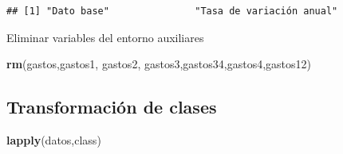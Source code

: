\documentclass[notspecified,article,submit,moreauthors,pdftex]{Definitions/mdpi}
\newenvironment{Shaded}{\begin{snugshade}}{\end{snugshade}}
\newcommand{\AttributeTok}[1]{\textcolor[rgb]{0.13,0.29,0.53}{#1}}
\newcommand{\CommentTok}[1]{\textcolor[rgb]{0.56,0.35,0.01}{\textit{#1}}}
\newcommand{\DecValTok}[1]{\textcolor[rgb]{0.00,0.00,0.81}{#1}}
\newcommand{\FunctionTok}[1]{\textcolor[rgb]{0.13,0.29,0.53}{\textbf{#1}}}
\newcommand{\NormalTok}[1]{#1}
\newcommand{\OtherTok}[1]{\textcolor[rgb]{0.56,0.35,0.01}{#1}}
\newcommand{\SpecialCharTok}[1]{\textcolor[rgb]{0.81,0.36,0.00}{\textbf{#1}}}
\newcommand{\StringTok}[1]{\textcolor[rgb]{0.31,0.60,0.02}{#1}}
\begin{document}
\begin{Shaded}
\end{Shaded}

\begin{verbatim}
## [1] "Dato base"               "Tasa de variación anual"
\end{verbatim}

\begin{Shaded}
\end{Shaded}

Eliminar variables del entorno auxiliares

\begin{Shaded}
\begin{Highlighting}[]
\FunctionTok{rm}\NormalTok{(gastos,gastos1, gastos2, gastos3,gastos34,gastos4,gastos12)}
\end{Highlighting}
\end{Shaded}

\subsection{Transformación de clases}\label{transformaciuxf3n-de-clases}

\begin{Shaded}
\begin{Highlighting}[]
\FunctionTok{lapply}\NormalTok{(datos,class)}
\end{Highlighting}
\end{Shaded}
\end{document}
